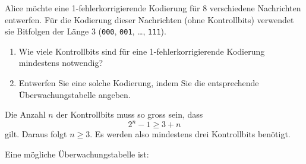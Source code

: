 \begin{myexercise}
    Alice möchte eine 1-fehlerkorrigierende Kodierung für
    8 verschiedene Nachrichten entwerfen. Für die Kodierung
    dieser Nachrichten (ohne Kontrollbits) verwendet sie
    Bitfolgen der Länge 3
    (\texttt{000}, \texttt{001}, \ldots, \texttt{111}).

    \begin{enumerate}
        \item Wie viele Kontrollbits sind für eine
              1-fehlerkorrigierende Kodierung mindestens notwendig?

        \item Entwerfen Sie eine solche Kodierung, indem Sie
              die entsprechende Überwachungstabelle angeben.
    \end{enumerate}
    \begin{myanswer}

        Die Anzahl \(n\) der Kontrollbits muss so gross sein, dass
        \[
            2^n-1 \geq 3+n
        \]
        gilt. Daraus folgt \(n\geq 3\). Es werden also mindestens
        drei Kontrollbits benötigt.

        Eine mögliche Überwachungstabelle ist:

        \begin{center}
\end{center}
\end{myanswer}
\end{myexercise}
